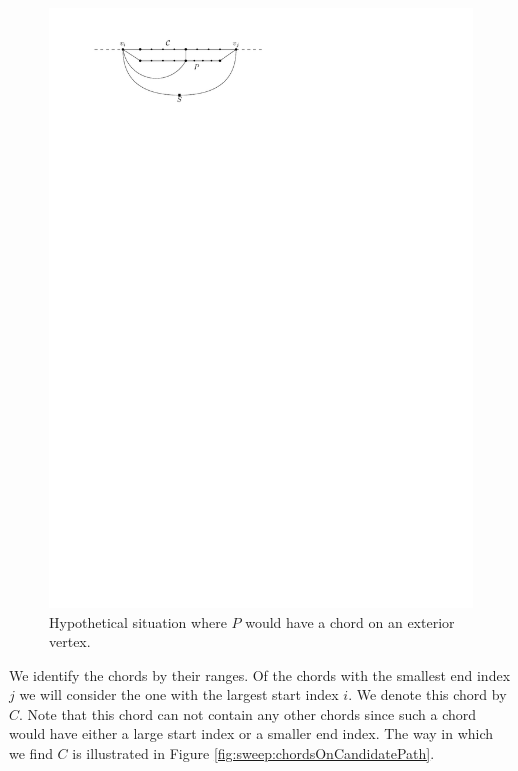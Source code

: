     \begin{figure}[h]
      \centering
      \includegraphics[scale=1]{unifiedAlgo/img/sweep/noChordOnExtriorVertex.pdf}
      \caption{Hypothetical situation where $P$ would have a chord on an exterior vertex.}
      \label{fig:sweep:noChordOnExteriorVertex}
    \end{figure}

    We identify the chords by their ranges. Of the chords with the smallest end index $j$ we will consider the one with the largest start index $i$. We denote this chord by $C$.
    Note that this chord can not contain any other chords since such a chord would have either a large start index or a smaller end index.
    The way in which we find $C$ is illustrated in Figure \ref{fig:sweep:chordsOnCandidatePath}.

